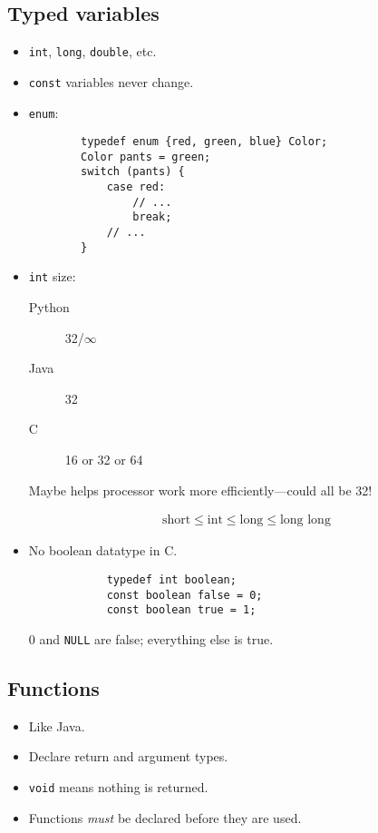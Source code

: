 \subsection{Typed variables}
\begin{itemize}
	\item \texttt{int}, \texttt{long}, \texttt{double}, etc.
	\item \texttt{const} variables never change.
	\item \texttt{enum}:
	
	\begin{verbatim}
		typedef enum {red, green, blue} Color;
		Color pants = green;
		switch (pants) {
			case red:
				// ...
				break;
			// ...
		}
	\end{verbatim}
	\item \texttt{int} size:\begin{description}
		\item[Python] 32/\(\infty\)
		\item[Java] 32
		\item[C] 16 or 32 or 64
	\end{description}
	
	Maybe helps processor work more efficiently---could all be 32!
	
	\begin{align*}
		\text{short} \leq \text{int} \leq \text{long} \leq \text{long long}
	\end{align*}
	\item No boolean datatype in C.
		\begin{verbatim}
			typedef int boolean;
			const boolean false = 0;
			const boolean true = 1;
		\end{verbatim}
		
		0 and \texttt{NULL} are false; everything else is true.
\end{itemize}

\subsection{Functions}
\begin{itemize}
	\item Like Java.
	\item Declare return and argument types.
	\item \texttt{void} means nothing is returned.
	\item Functions \emph{must} be declared before they are used.
\end{itemize}

